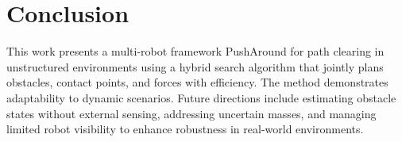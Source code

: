 \section{Conclusion} \label{sec:conclusion}
This work presents a multi-robot framework PushAround for path clearing in unstructured environments using a
hybrid search algorithm that jointly plans obstacles, contact points, and forces with efficiency.
The method demonstrates adaptability to dynamic scenarios. Future directions include estimating
obstacle states without external sensing, addressing uncertain masses, and managing limited robot
visibility to enhance robustness in real-world environments.
